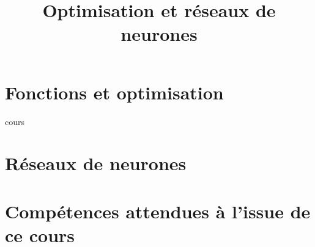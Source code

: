\documentclass[fleqn,a4paper,11pt]{book}
\title{Optimisation et réseaux de neurones}
\begin{document}
\maketitle
\tableofcontents
\newpage

\chapter{Fonctions et optimisation}

{cours}

\newpage

\chapter{Réseaux de neurones}

\newpage



\appendix
\chapter{Compétences attendues à l'issue de ce cours}

\end{document}
